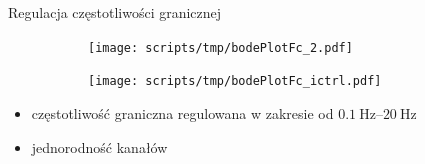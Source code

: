 \begin{frame}{Regulacja częstotliwości granicznej}

    \begin{figure}[H]
        \centering
        \begin{subfigure}[b]{0.485\textwidth}
            \centering
            \texttt{[image: scripts/tmp/bodePlotFc\_2.pdf]}  

        \end{subfigure}
        \begin{subfigure}[b]{0.485\textwidth}
            \centering
            \texttt{[image: scripts/tmp/bodePlotFc\_ictrl.pdf]}

        \end{subfigure}     

    \end{figure}
    \vspace{-1em}
    \begin{block}{}
        \begin{itemize}
            \item częstotliwość graniczna regulowana w zakresie od $\SIrange{0.1}{20}{\hertz}$ 
            \item jednorodność kanałów 
        \end{itemize}
    \end{block}


\end{frame}

%  






